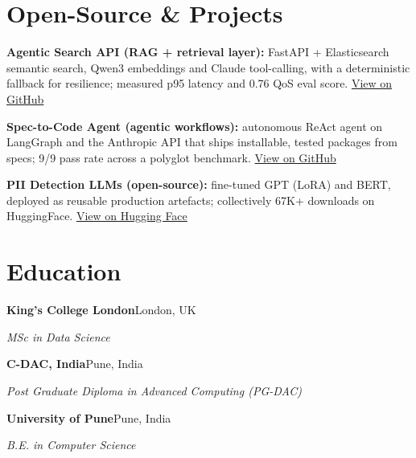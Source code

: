 \documentclass[10pt,a4paper]{article}
\begin{document}
\section{Open-Source \& Projects}
\begin{tight}
  \item \textbf{Agentic Search API (RAG + retrieval layer):} FastAPI + Elasticsearch semantic search, Qwen3 embeddings and Claude tool-calling, with a deterministic fallback for resilience; measured p95 latency and 0.76 QoS eval score. \href{https://github.com/abhijeetscode/search-agent}{View on GitHub}
  \item \textbf{Spec-to-Code Agent (agentic workflows):} autonomous ReAct agent on LangGraph and the Anthropic API that ships installable, tested packages from specs; 9/9 pass rate across a polyglot benchmark. \href{https://github.com/abhijeetscode/Spec-to-Code-Agent}{View on GitHub}
  \item \textbf{PII Detection LLMs (open-source):} fine-tuned GPT (LoRA) and BERT, deployed as reusable production artefacts; collectively 67K+ downloads on HuggingFace. \href{https://huggingface.co/ab-ai/pii_model}{View on Hugging Face}
\end{tight}

\section{Education}
{\color{company}\bfseries King's College London}\hfill {\color{muted}London, UK}\par
{\itshape MSc in Data Science}\par\vspace{2pt}
{\color{company}\bfseries C-DAC, India}\hfill {\color{muted}Pune, India}\par
{\itshape Post Graduate Diploma in Advanced Computing (PG-DAC)}\par\vspace{2pt}
{\color{company}\bfseries University of Pune}\hfill {\color{muted}Pune, India}\par
{\itshape B.E. in Computer Science}\par
\end{document}
